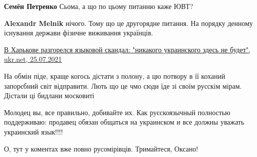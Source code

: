 \begin{itemize}
\begin{itemize}
\textbf{Семён Петренко} Сьома, а що по цьому питанню каже ЮВТ?

 
\textbf{Alexandr Melnik} нічого. Тому що це другорядне питання. На порядку
денному існування держави фізичне виживання українців.

\end{itemize}

 
\href{https://www.ukr.net/news/details/society/86244771.html}{%
В Харькове разгорелся языковой скандал: "никакого украинского здесь не будет", ukr.net, 25.07.2021%
}

 

На обмін піде, краще когось дістати з полону, а цю потвору в її коханий
запорєбний світ відправити. Лють що це чмо сюди їде зі своїм русскім мірам.
Дістали ці бидлани московиті


 

Молодец вы, все правильно, добивайте их. Как русскоязычный полностью
поддерживаю: продавец обязан общаться на украинском и все должны уважать
украинский язык!!!!


 

О, тут у коментах вже повно русомірівців. Тримайтеся, Оксано!


\end{itemize}
